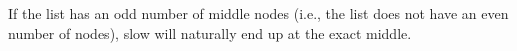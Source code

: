 \documentclass[preview]{standalone}
\begin{document}
If the list has an odd number of middle nodes (i.e., the list does not have an even number of nodes), slow will naturally end up at the exact middle.\\
\end{document}
